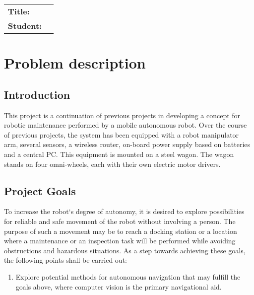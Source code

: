 \begin{titlingpage}

\noindent
\begin{tabular}{@{}p{4cm}l}
\textbf{Title:} 	& \thetitle \\
\textbf{Student:}	& \theauthor \\
\end{tabular}


\section*{Problem description}

\subsection*{Introduction}

This project is a continuation of previous projects in developing a concept for robotic maintenance performed by a mobile autonomous robot.  Over the course of previous projects, the system has been equipped with a robot manipulator arm, several sensors, a wireless router, on-board power supply based on batteries and a central PC. This equipment is mounted on a steel wagon. The wagon stands on four omni-wheels, each with their own electric motor drivers.

\subsection*{Project Goals}

To increase the robot`s degree of autonomy, it is desired to explore possibilities for reliable and safe movement of the robot without involving a person. The purpose of such a movement may be to reach a docking station or a location where a maintenance or an inspection task will be performed while avoiding obstructions and hazardous situations. As a step towards achieving these goals, the following points shall be carried out:

\begin{enumerate}
	
	\item Explore potential methods for autonomous navigation that may fulfill the goals above, where computer vision is the primary navigational aid. 
	

\end{enumerate}
\end{titlingpage}
